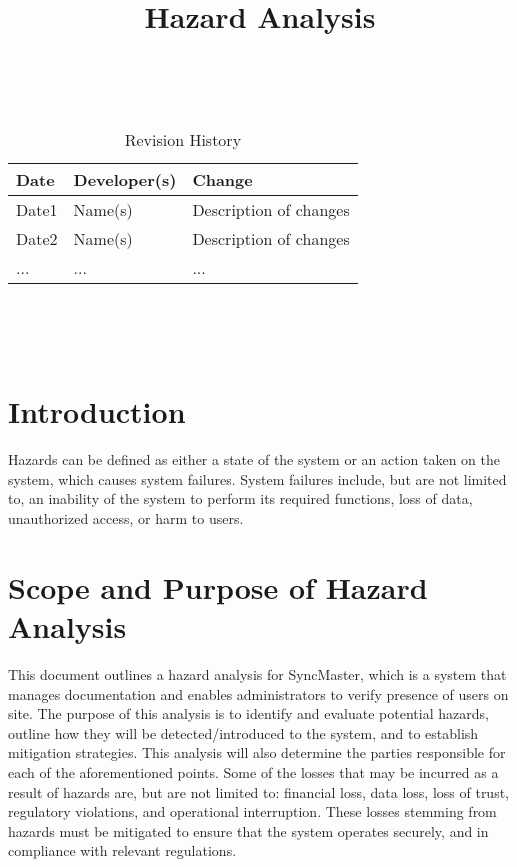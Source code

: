 \documentclass{article}
\title{Hazard Analysis\\\progname}
\author{\authname}
\date{}
\begin{document}
\maketitle
\thispagestyle{empty}

~\newpage


\begin{table}[hp]
  \caption{Revision History} \label{TblRevisionHistory}
  \begin{tabularx}{\textwidth}{llX}
    \toprule
    \textbf{Date} & \textbf{Developer(s)} & \textbf{Change}\\
    \midrule
    Date1 & Name(s) & Description of changes\\
    Date2 & Name(s) & Description of changes\\
    ... & ... & ...\\
    \bottomrule
  \end{tabularx}
\end{table}

~\newpage

\tableofcontents

~\newpage



\section{Introduction}

Hazards can be defined as either a state of the system or an action
taken on the system, which causes system failures. System failures
include, but are not limited to, an inability of the system to
perform its required functions, loss of data, unauthorized access,
or harm to users.

\section{Scope and Purpose of Hazard Analysis}

This document outlines a hazard analysis for SyncMaster, which is a system that
manages documentation and enables administrators to verify presence of users on
site. The purpose of this analysis is to identify and evaluate potential
hazards, outline how they will be detected/introduced to the system, and to
establish mitigation strategies. This analysis will also determine
the parties responsible
for each of the aforementioned points. Some of the losses that
may be incurred as a result of hazards are, but are not limited to:
financial loss, data loss, loss of trust, regulatory violations, and
operational interruption. These losses stemming from hazards must be mitigated
to ensure that the system operates securely, and in compliance with relevant
regulations.
\end{document}
